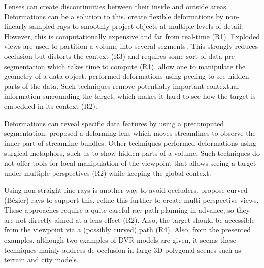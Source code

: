 Lenses can create discontinuities between their inside and outside areas. Deformations can be a solution to this.
 \cite{Hsu:2011:RFM:2070781.2024165} create flexible deformations by non-linearly sampled rays to smoothly project objects at multiple levels of detail. However, this is computationally expensive and far from real-time (R1). Exploded views are used to partition a volume into several segments\,\cite{Sonnet:2004:IEA:989863.989871,4015467}. This strongly reduces occlusion but distorts the context (R3) and requires some sort of data pre-segmentation which takes time to compute (R1). \cite{Correa:2007:IDD:1313046.1313163,Correa:2006:FAV:1187627.1187827} allow one to manipulate the geometry of a data object.\cite{1250400} performed deformations using peeling to see hidden parts of the data. Such techniques remove potentially important contextual information surrounding the target, which makes it hard to see how the target is embedded in its context (R2).

Deformations can reveal specific data features by using a precomputed segmentation. \cite{7332955} proposed a deforming lens which moves streamlines to observe the inner part of streamline bundles. Other techniques performed deformations using surgical metaphors, such us \cite{4069230,Correa:2006:FAV:1187627.1187827} to show hidden parts of a volume. Such techniques do not offer tools for local manipulation of the viewpoint that allows seeing a target under multiple perspectives (R2) while keeping the global context. 

Using non-straight-line rays is another way to avoid occluders. \cite{5613463} propose curved (B{\'e}zier) rays to support this.  \cite{7120994} refine this further to create multi-perspective views. These approaches require a quite careful ray-path planning in advance, so they are not directly aimed at a lens effect (R2). Also, the target should be accessible from the viewpoint via a (possibly curved) path (R4). Also, from the presented examples, although two examples of DVR models are given, it seems these techniques mainly address de-occlusion in large 3D polygonal scenes such as terrain and city models.


